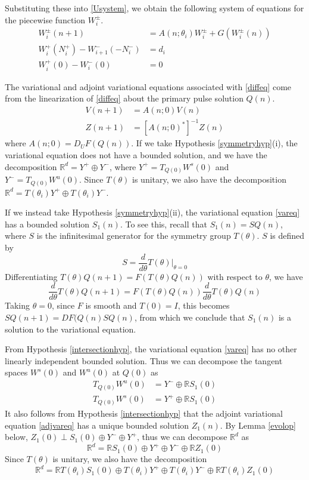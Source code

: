 \documentclass[12pt]{article}
\def\R{{\mathbb R}}
\begin{document}
Substituting these into \eqref{Usystem}, we obtain the following system of equations for the piecewise function $W_i^\pm$.
\begin{align}
W_i^\pm(n+1) &= A(n; \theta_i) W_i^\pm + G(W_i^\pm(n)) \label{Wsystem1} \\
W_i^+(N_i^+) - W_{i+1}^-(-N_i^-) &= d_i \label{Wsystem2} \\
W_i^+(0) - W_i^-(0) &= 0 \label{Wsystem3}
\end{align}

The variational and adjoint variational equations associated with \eqref{diffeq} come from the linearization of \eqref{diffeq} about the primary pulse solution $Q(n)$.
\begin{align}
V(n+1) &= A(n; 0) V(n) \label{vareq} \\
Z(n+1) &= [A(n; 0)^*]^{-1} Z(n) \label{adjvareq} 
\end{align}
where $A(n; 0) = D_U F(Q(n))$. If we take Hypothesis \ref{symmetryhyp}(i), the variational equation does not have a bounded solution, and we have the decomposition $\R^d = Y^+ \oplus Y^-$, where $Y^+ = T_{Q(0)} W^s(0)$ and $Y^- = T_{Q(0)} W^u(0)$. Since $T(\theta)$ is unitary, we also have the decomposition $\R^d = T(\theta_i) Y^+ \oplus T(\theta_i) Y^-$.

If we instead take Hypothesis \ref{symmetryhyp}(ii), the variational equation \eqref{vareq} has a bounded solution $S_1(n)$. To see this, recall that $S_1(n) = S Q(n)$, where $S$ is the infinitesimal generator for the symmetry group $T(\theta)$. $S$ is defined by
\begin{equation}
S = \frac{d}{d \theta} T(\theta)\Big|_{\theta = 0}
\end{equation}
Differentiating $T(\theta) Q(n+1) = F(T(\theta)Q(n))$ with respect to $\theta$, we have
\[
\frac{d}{d \theta}T(\theta) Q(n+1) = F(T(\theta)Q(n)) \frac{d}{d \theta}T(\theta) Q(n)
\]
Taking $\theta = 0$, since $F$ is smooth and $T(0) = I$, this becomes $S Q(n+1) = DF(Q(n) S Q(n)$, from which we conclude that $S_1(n)$ is a solution to the variational equation. 

From Hypothesis \ref{intersectionhyp}, the variational equation \eqref{vareq} has no other linearly independent bounded solution. Thus we can decompose the tangent spaces $W^s(0)$ and $W^u(0)$ at $Q(0)$ as
\begin{align*}
T_{Q(0)} W^u(0) &= Y^- \oplus \R S_1(0) \\
T_{Q(0)} W^s(0) &= Y^+ \oplus \R S_1(0)
\end{align*}
It also follows from Hypothesis \ref{intersectionhyp} that the adjoint variational equation \eqref{adjvareq} has a unique bounded solution $Z_1(n)$. By Lemma \ref{evolop} below, $Z_1(0) \perp S_1(0) \oplus Y^- \oplus Y^+$, thus we can decompose $\R^d$ as
\begin{equation}\label{nontdecomp}
\R^d = \R S_1(0) \oplus Y^+ \oplus Y^- \oplus \R Z_1(0)
\end{equation}
Since $T(\theta)$ is unitary, we also have the decomposition
\begin{equation}\label{nontdecompT}
\R^d = \R T(\theta_i) S_1(0) \oplus T(\theta_i) Y^+ \oplus T(\theta_i) Y^- \oplus \R T(\theta_i) Z_1(0)
\end{equation}
\end{document}
